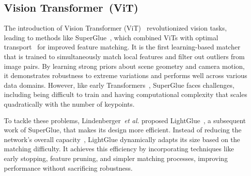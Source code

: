 \subsection{Vision Transformer~(ViT)}

The introduction of Vision Transformer (ViT)~\cite{dosovitskiy2020image} revolutionized vision tasks, leading to methods like SuperGlue~\cite{sarlin2020superglue}, which combined ViTs with optimal transport~\cite{peyre2019computational} for improved feature matching. It is the first learning-based matcher that is trained to simultaneously match local features and filter out outliers from image pairs. By learning strong priors about scene geometry and camera motion, it demonstrates robustness to extreme variations and performs well across various data domains. However, like early Transformers~\cite{beltagy2020longformer,keles2023computational}, SuperGlue faces challenges, including being difficult to train and having computational complexity that scales quadratically with the number of keypoints.


To tackle these problems, Lindenberger~\textit{et al.} proposed LightGlue~\cite{lindenberger2023lightglue}, a subsequent work of SuperGlue, that makes its design more efficient. Instead of reducing the network's overall capacity~\cite{chen2021learning,shi2022clustergnn}, LightGlue dynamically adapts its size based on the matching difficulty. It achieves this efficiency by incorporating techniques like early stopping, feature pruning, and simpler matching processes, improving performance without sacrificing robustness.


